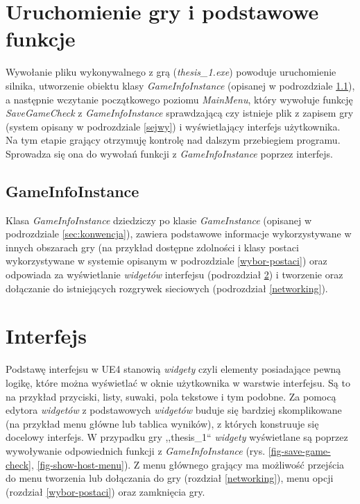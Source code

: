 \documentclass[multip]{SGGW-thesis}
\begin{document}
\section{Uruchomienie gry i podstawowe funkcje}
Wywołanie pliku wykonywalnego z grą ({\em thesis\_1.exe}) powoduje uruchomienie silnika, utworzenie obiektu klasy {\em GameInfoInstance} (opisanej w podrozdziale \ref{gameinfoinstance}), a następnie wczytanie początkowego poziomu {\em MainMenu}, który wywołuje funkcję {\em SaveGameCheck} z {\em GameInfoInstance} sprawdzającą czy istnieje plik z zapisem gry (system opisany w podrozdziale \ref{sejwy}) i wyświetlający interfejs użytkownika. Na tym etapie grający otrzymuję kontrolę nad dalszym przebiegiem programu. Sprowadza się ona do wywołań funkcji z {\em GameInfoInstance} poprzez interfejs.
	\subsection{GameInfoInstance}
		\label{gameinfoinstance}
		Klasa {\em GameInfoInstance} dziedziczy po klasie {\em GameInstance} (opisanej w podrozdziale \ref{sec:konwencja}), zawiera podstawowe informacje wykorzystywane w innych obszarach gry (na przykład dostępne zdolności i klasy postaci wykorzystywane w systemie opisanym w podrozdziale \ref{wybor-postaci}) oraz odpowiada za wyświetlanie {\em widgetów} interfejsu (podrozdział \ref{interface}) i tworzenie oraz dołączanie do istniejących rozgrywek sieciowych (podrozdział \ref{networking}).
	

\section{Interfejs}
	\label{interface}
	Podstawę interfejsu w UE4 stanowią {\em widgety} czyli elementy posiadające pewną logikę, które można wyświetlać w oknie użytkownika w warstwie interfejsu. Są to na przykład przyciski, listy, suwaki, pola tekstowe i tym podobne. Za pomocą edytora {\em widgetów} z podstawowych {\em widgetów} buduje się bardziej skomplikowane (na przykład menu główne lub tablica wyników), z których konstruuje się docelowy interfejs.
	\newline
	\newline W przypadku gry ,,thesis\_1`` {\em widgety} wyświetlane są poprzez wywoływanie odpowiednich funkcji z {\em GameInfoInstance} (rys. \ref{fig-save-game-check}, \ref{fig-show-host-menu}). 
	\newline Z menu głównego grający ma możliwość przejścia do menu tworzenia lub dołączania do gry (rozdział \ref{networking}), menu opcji (rozdział \ref{wybor-postaci}) oraz zamknięcia gry.
\end{document}
